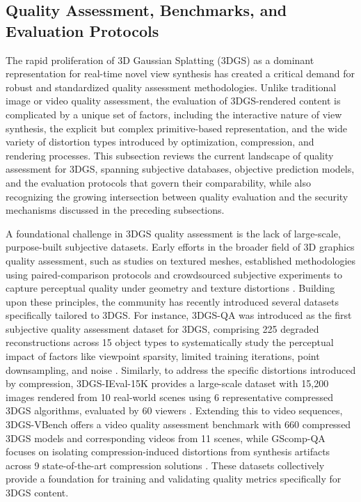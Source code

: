 \documentclass[11pt]{article}
\begin{document}
\subsection{Quality Assessment, Benchmarks, and Evaluation Protocols}

The rapid proliferation of 3D Gaussian Splatting (3DGS) as a dominant representation for real-time novel view synthesis has created a critical demand for robust and standardized quality assessment methodologies. Unlike traditional image or video quality assessment, the evaluation of 3DGS-rendered content is complicated by a unique set of factors, including the interactive nature of view synthesis, the explicit but complex primitive-based representation, and the wide variety of distortion types introduced by optimization, compression, and rendering processes. This subsection reviews the current landscape of quality assessment for 3DGS, spanning subjective databases, objective prediction models, and the evaluation protocols that govern their comparability, while also recognizing the growing intersection between quality evaluation and the security mechanisms discussed in the preceding subsections.

A foundational challenge in 3DGS quality assessment is the lack of large-scale, purpose-built subjective datasets. Early efforts in the broader field of 3D graphics quality assessment, such as studies on textured meshes, established methodologies using paired-comparison protocols and crowdsourced subjective experiments to capture perceptual quality under geometry and texture distortions \cite{ref733,ref734}. Building upon these principles, the community has recently introduced several datasets specifically tailored to 3DGS. For instance, 3DGS-QA was introduced as the first subjective quality assessment dataset for 3DGS, comprising 225 degraded reconstructions across 15 object types to systematically study the perceptual impact of factors like viewpoint sparsity, limited training iterations, point downsampling, and noise \cite{ref735}. Similarly, to address the specific distortions introduced by compression, 3DGS-IEval-15K provides a large-scale dataset with 15,200 images rendered from 10 real-world scenes using 6 representative compressed 3DGS algorithms, evaluated by 60 viewers \cite{ref736}. Extending this to video sequences, 3DGS-VBench offers a video quality assessment benchmark with 660 compressed 3DGS models and corresponding videos from 11 scenes, while GScomp-QA focuses on isolating compression-induced distortions from synthesis artifacts across 9 state-of-the-art compression solutions \cite{ref737,ref738}. These datasets collectively provide a foundation for training and validating quality metrics specifically for 3DGS content.
\end{document}
